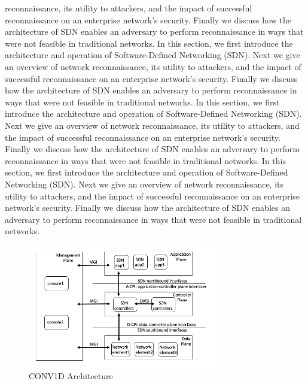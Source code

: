 reconnaissance, its utility to attackers, and the impact of successful
reconnaissance on an enterprise network's security. Finally  we discuss
how the architecture of SDN enables an adversary to perform reconnaissance 
in ways that were not feasible in traditional networks. In this section, we first introduce the architecture and operation of
Software-Defined Networking (SDN). Next we give an overview of network 
reconnaissance, its utility to attackers, and the impact of successful
reconnaissance on an enterprise network's security. Finally  we discuss
how the architecture of SDN enables an adversary to perform reconnaissance 
in ways that were not feasible in traditional networks. 
In this section, we first introduce the architecture and operation of
Software-Defined Networking (SDN). Next we give an overview of network 
reconnaissance, its utility to attackers, and the impact of successful
reconnaissance on an enterprise network's security. Finally  we discuss
how the architecture of SDN enables an adversary to perform reconnaissance 
in ways that were not feasible in traditional networks. 
In this section, we first introduce the architecture and operation of
Software-Defined Networking (SDN). Next we give an overview of network 
reconnaissance, its utility to attackers, and the impact of successful
reconnaissance on an enterprise network's security. Finally  we discuss
how the architecture of SDN enables an adversary to perform reconnaissance 
in ways that were not feasible in traditional networks. 


\begin{figure}[t]
  \centering 
  \includegraphics[width=3.3in]{img/CONV1D.png} 
  \caption{CONV1D Architecture} 
  \label{fig:CONV1D} 
\end{figure}

